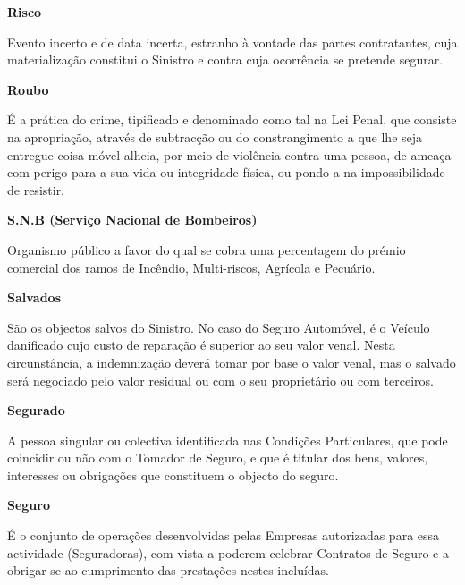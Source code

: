 \begin{description}
\item \textbf{Risco}

Evento incerto e de data incerta, estranho à vontade das partes contratantes, cuja materialização constitui o Sinistro e contra cuja ocorrência se pretende segurar.
\end{description}

\begin{description}
\item \textbf{Roubo}

É a prática do crime, tipificado e denominado como tal na Lei Penal, que consiste na apropriação, através de subtracção ou do constrangimento a que lhe seja entregue coisa móvel alheia, por meio de violência contra uma pessoa, de ameaça com perigo para a sua vida ou integridade física, ou pondo-a na impossibilidade de resistir.
\end{description}

\begin{description}
\item \textbf{S.N.B (Serviço Nacional de Bombeiros)}

Organismo público a favor do qual se cobra uma percentagem do prémio comercial dos ramos de Incêndio, Multi-riscos, Agrícola e Pecuário.
\end{description}

\begin{description}
\item \textbf{Salvados}

São os objectos salvos do Sinistro. No caso do Seguro Automóvel, é o Veículo danificado cujo custo de reparação é superior ao seu valor venal. Nesta circunstância, a indemnização deverá tomar por base o valor venal, mas o salvado será negociado pelo valor residual ou com o seu proprietário ou com terceiros.
\end{description}

\begin{description}
\item \textbf{Segurado}

A pessoa singular ou colectiva identificada nas Condições Particulares, que pode coincidir ou não com o Tomador de Seguro, e que é titular dos bens, valores, interesses ou obrigações que constituem o objecto do seguro.
\end{description}

\begin{description}
\item \textbf{Seguro}

É o conjunto de operações desenvolvidas pelas Empresas autorizadas para essa actividade (Seguradoras), com vista a poderem celebrar Contratos de Seguro e a obrigar-se ao cumprimento das prestações nestes incluídas.
\end{description}

